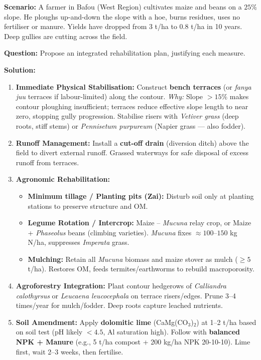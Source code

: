\documentclass[11pt]{article}
\begin{document}
\begin{exemplebox}
\textbf{Scenario:} A farmer in Bafou (West Region) cultivates maize and beans on a $25\%$ slope. He ploughs up-and-down the slope with a hoe, burns residues, uses no fertiliser or manure. Yields have dropped from 3 t/ha to 0.8 t/ha in 10 years. Deep gullies are cutting across the field.

\textbf{Question:} Propose an integrated rehabilitation plan, justifying each measure.

\textbf{Solution:}
\begin{enumerate}
    \item \textbf{Immediate Physical Stabilisation:} Construct \textbf{bench terraces} (or \emph{fanya juu} terraces if labour-limited) along the contour. \emph{Why:} Slope $> 15\%$ makes contour ploughing insufficient; terraces reduce effective slope length to near zero, stopping gully progression. Stabilise risers with \emph{Vetiver grass} (deep roots, stiff stems) or \emph{Pennisetum purpureum} (Napier grass — also fodder).
    \item \textbf{Runoff Management:} Install a \textbf{cut-off drain} (diversion ditch) above the field to divert external runoff. Grassed waterways for safe disposal of excess runoff from terraces.
    \item \textbf{Agronomic Rehabilitation:}
        \begin{itemize}
            \item \textbf{Minimum tillage / Planting pits (Zai):} Disturb soil only at planting stations to preserve structure and OM.
            \item \textbf{Legume Rotation / Intercrop:} Maize – \emph{Mucuna} relay crop, or Maize + \emph{Phaseolus} beans (climbing varieties). \emph{Mucuna} fixes $\approx 100–150$ kg N/ha, suppresses \emph{Imperata} grass.
            \item \textbf{Mulching:} Retain all \emph{Mucuna} biomass and maize stover as mulch ($\geq 5$ t/ha). Restores OM, feeds termites/earthworms to rebuild macroporosity.
        \end{itemize}
    \item \textbf{Agroforestry Integration:} Plant contour hedgerows of \emph{Calliandra calothyrsus} or \emph{Leucaena leucocephala} on terrace risers/edges. Prune 3–4 times/year for mulch/fodder. Deep roots capture leached nutrients.
    \item \textbf{Soil Amendment:} Apply \textbf{dolomitic lime} (CaMg(CO$_3$)$_2$) at 1–2 t/ha based on soil test (pH likely $< 4.5$, Al saturation high). Follow with \textbf{balanced NPK + Manure} (e.g., 5 t/ha compost + 200 kg/ha NPK 20-10-10). Lime first, wait 2–3 weeks, then fertilise.

\end{enumerate}
\end{exemplebox}
\end{document}
